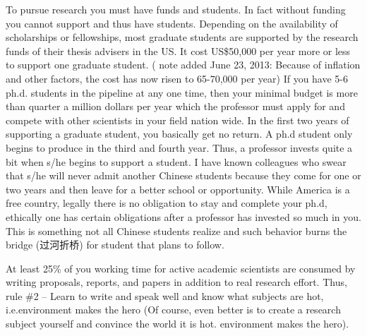 \documentclass{article}
\begin{document}
To pursue research you must have funds and students. In fact without funding you cannot support and thus have students. Depending on the availability of scholarships or fellowships, most graduate students are supported by the research funds of their thesis advisers in the US. It cost US\$50,000 per year more or less to support one graduate student. ( note added June 23, 2013: Because of inflation and other factors, the cost has now risen to 65-70,000 per year)  If you have 5-6 ph.d. students  in the pipeline at any one time, then your minimal budget is more than quarter a million dollars per year which the professor must apply for and compete with other scientists in your field nation wide.  In the first two years of supporting a graduate student,  you basically get no return. A ph.d student only begins to produce in the third and fourth year. Thus, a professor invests quite a bit when s/he begins to support a student.  I have known colleagues who swear that s/he will never admit another Chinese students because they come for one or two years and then leave for a better school or opportunity. While America is a free country, legally there is no obligation to stay and complete your ph.d, ethically one has certain obligations after a professor has invested so much in you.  This is something not all Chinese students realize and such behavior burns the bridge (过河折桥) for student that plans to follow. 


At least 25\% of you working time for active academic scientists are consumed by writing proposals, reports, and papers in addition to real research effort. Thus, rule \#2 – Learn to write and speak well and know what subjects are hot, i.e.environment makes the hero (Of course, even better is to create a research subject yourself and convince the world it is hot. environment makes the hero).
\end{document}
